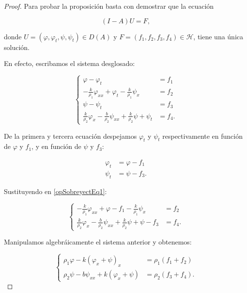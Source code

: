 \begin{proof}
    Para probar la proposición basta con demostrar que la ecuación

    \[(I-A)U = F,\]

    donde $U=(\varphi, \varphi_t, \psi, \psi_t) \in D(A)$ y $F = (f_1, f_2, f_3, f_4) \in \mathcal{H}$, tiene una única solución. 

    En efecto, escribamos el sistema desglosado:

    \begin{equation}
        \label{opSobreyectEq1}
        \begin{cases}
            \varphi - \varphi_t &= f_1\\
            -\frac{k}{\rho_1}\varphi_{xx} + \varphi_t - \frac{k}{\rho_1}\psi_x &= f_2\\
            \psi - \psi_t &= f_3\\
            \frac{k}{\rho_2}\varphi_x - \frac{b}{\rho_2}\psi_{xx} + \frac{k}{\rho_2}\psi + \psi_t &= f_4.
        \end{cases}
    \end{equation}

    De la primera y tercera ecuación despejamos $\varphi_t$ y $\psi_t$ respectivamente en función de $\varphi$ y $f_1$, y en función de $\psi$ y $f_3$:

    \begin{align*}
        \varphi_t &= \varphi - f_1\\
        \psi_t &= \psi - f_3.
    \end{align*}

    Sustituyendo en \eqref{opSobreyectEq1}:

    \begin{equation*}
        \begin{cases}
            -\frac{k}{\rho_1}\varphi_{xx} + \varphi - f_1 - \frac{k}{\rho_1}\psi_x &= f_2\\
            \frac{k}{\rho_2}\varphi_x - \frac{b}{\rho_2}\psi_{xx} + \frac{k}{\rho_2}\psi + \psi - f_3 &= f_4.
        \end{cases}
    \end{equation*}

    Manipulamos algebráicamente el sistema anterior y obtenemos:

    \begin{equation}
        \label{opSobreyectEq2}
        \begin{cases}
            \rho_1\varphi - k(\varphi_x + \psi)_x &= \rho_1(f_1 + f_2)\\
            \rho_2\psi - b\psi_{xx} + k(\varphi_x + \psi) &= \rho_2(f_3 + f_4).
        \end{cases}
    \end{equation}


\end{proof}
